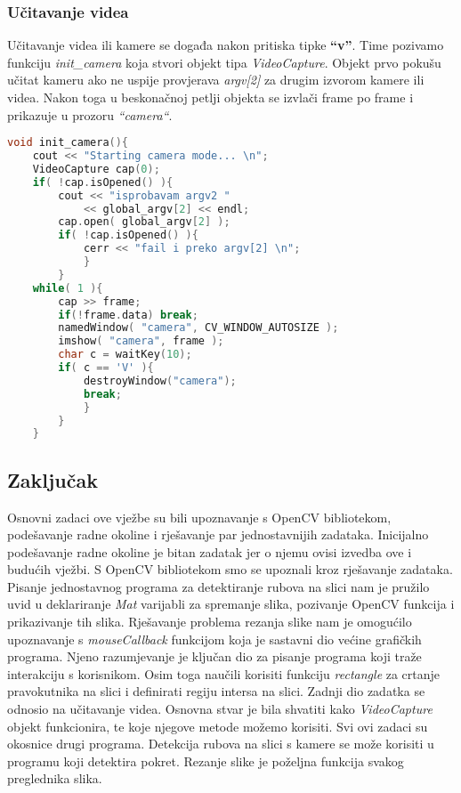 \subsubsection{Učitavanje videa}
Učitavanje videa ili kamere se događa nakon pritiska tipke
\textbf{``v''}. Time pozivamo funkciju \textit{init\_camera} koja
stvori objekt tipa \textit{VideoCapture}. Objekt prvo pokušu učitat
kameru ako ne uspije provjerava \textit{argv[2]} za drugim izvorom
kamere ili videa. Nakon toga u beskonačnoj petlji objekta se izvlači 
frame po frame i prikazuje u prozoru \textit{``camera``}.
\\
\begin{lstlisting}[language=C,caption={Učitavanje videa}]
void init_camera(){
    cout << "Starting camera mode... \n";
    VideoCapture cap(0);
    if( !cap.isOpened() ){
        cout << "isprobavam argv2 " 
            << global_argv[2] << endl;
        cap.open( global_argv[2] );
        if( !cap.isOpened() ){
            cerr << "fail i preko argv[2] \n"; 
            } 
        }
    while( 1 ){
        cap >> frame;
        if(!frame.data) break;
        namedWindow( "camera", CV_WINDOW_AUTOSIZE );
        imshow( "camera", frame );
        char c = waitKey(10);
        if( c == 'V' ){
            destroyWindow("camera");
            break; 
            } 
        } 
    }
\end{lstlisting}


\subsection{Zaključak}


Osnovni zadaci ove vježbe su bili upoznavanje s OpenCV bibliotekom,
podešavanje radne okoline i rješavanje par jednostavnijih zadataka.
Inicijalno podešavanje radne okoline je bitan zadatak jer o njemu ovisi
izvedba ove i budućih vježbi.
S OpenCV bibliotekom smo se upoznali kroz rješavanje zadataka.
Pisanje jednostavnog programa za detektiranje rubova na slici nam je
pružilo uvid u deklariranje \textit{Mat} varijabli za spremanje slika,
pozivanje OpenCV funkcija i prikazivanje tih slika.
Rješavanje problema rezanja slike nam je omogućilo upoznavanje s
\textit{mouseCallback} funkcijom koja je sastavni dio većine grafičkih
programa. Njeno razumjevanje je ključan dio za pisanje programa koji traže
interakciju s korisnikom. Osim toga naučili korisiti funkciju
\textit{rectangle} za crtanje pravokutnika na slici i definirati regiju
intersa na slici. 
Zadnji dio zadatka se odnosio na učitavanje videa. Osnovna stvar je bila
shvatiti kako \textit{VideoCapture} objekt funkcionira, te koje njegove
metode možemo korisiti.
Svi ovi zadaci su okosnice drugi programa. Detekcija rubova na slici s
kamere se može korisiti u programu koji detektira pokret.
Rezanje slike je poželjna funkcija svakog preglednika slika.

